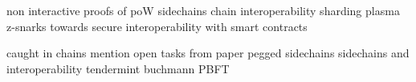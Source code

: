 


non interactive proofs of poW \cite{kiayias2017non} sidechains \cite{kiayias2019proof} chain interoperability \cite{buterin2016chain} sharding \cite{buterin2017sharding} plasma \cite{poon2017plasma} z-snarks \cite{garoffolo2020zendoo} towards secure interoperability with smart contracts \cite{dagher2017towards}

caught in chains mention open tasks from paper \cite{borkowski2018caught}
pegged sidechains \cite{back2014enabling}
sidechains and interoperability \cite{johnson2019sidechains}
tendermint \cite{kwon2014tendermint} buchmann \cite{buchman2016tendermint} PBFT \cite{castro1999practical}





